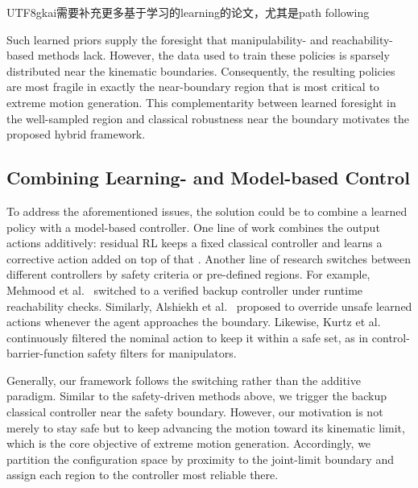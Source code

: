 \documentclass[journal, twoside]{IEEEtran}
\newcommand{\xinyitodo}[1]{{\color{darkgreen}\begin{CJK*}{UTF8}{gkai}#1\end{CJK*}}}
\begin{document}
\xinyitodo{需要补充更多基于学习的learning的论文，尤其是path following}

Such learned priors supply the foresight that manipulability- and reachability-based methods lack. However, the data used to train these policies is sparsely distributed near the kinematic boundaries. Consequently, the resulting policies are most fragile in exactly the near-boundary region that is most critical to extreme motion generation. This complementarity between learned foresight in the well-sampled region and classical robustness near the boundary motivates the proposed hybrid framework.

\subsection{Combining Learning- and Model-based Control}
To address the aforementioned issues, the solution could be to combine a learned policy with a model-based controller. One line of work combines the output actions additively: residual RL keeps a fixed classical controller and learns a corrective action added on top of that \cite{johannink2019residual,silver2018residual}. Another line of research switches between different controllers by safety criteria or pre-defined regions. For example, Mehmood et al.~\cite{mehmood2022black} switched to a verified backup controller under runtime reachability checks. Similarly, Alshiekh et al.~\cite{alshiekh2018safe} proposed to override unsafe learned actions whenever the agent approaches the boundary. Likewise, Kurtz et al.~\cite{kurtz2021control} continuously filtered the nominal action to keep it within a safe set, as in control-barrier-function safety filters for manipulators.

Generally, our framework follows the switching rather than the additive paradigm. Similar to the safety-driven methods above, we trigger the backup classical controller near the safety boundary. However, our motivation is not merely to stay safe but to keep advancing the motion toward its kinematic limit, which is the core objective of extreme motion generation. Accordingly, we partition the configuration space by proximity to the joint-limit boundary and assign each region to the controller most reliable there.
\end{document}
